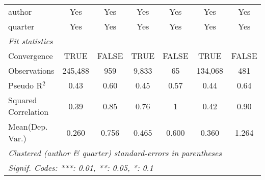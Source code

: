\begin{tabular}{lcccccc}
   author                                                     & Yes            & Yes          & Yes           & Yes           & Yes           & Yes\\  
   quarter                                                    & Yes            & Yes          & Yes           & Yes           & Yes           & Yes\\  
   \midrule
   \emph{Fit statistics}\\
   Convergence                                                &TRUE            & FALSE        & TRUE          & FALSE         & TRUE          & FALSE\\  
   Observations                                               & 245,488        & 959          & 9,833         & 65            & 134,068       & 481\\  
   Pseudo R$^2$                                               & 0.43           & 0.60         & 0.45          & 0.57          & 0.44          & 0.64\\  
   Squared Correlation                                        & 0.39           & 0.85         & 0.76          & 1             & 0.42          & 0.90\\  
Mean(Dep. Var.) & 0.260 & 0.756 & 0.465 & 0.600 & 0.360 & 1.264 \\
   \midrule \midrule
   \multicolumn{7}{l}{\emph{Clustered (author \& quarter) standard-errors in parentheses}}\\
   \multicolumn{7}{l}{\emph{Signif. Codes: ***: 0.01, **: 0.05, *: 0.1}}\\
\end{tabular}
\par\endgroup
